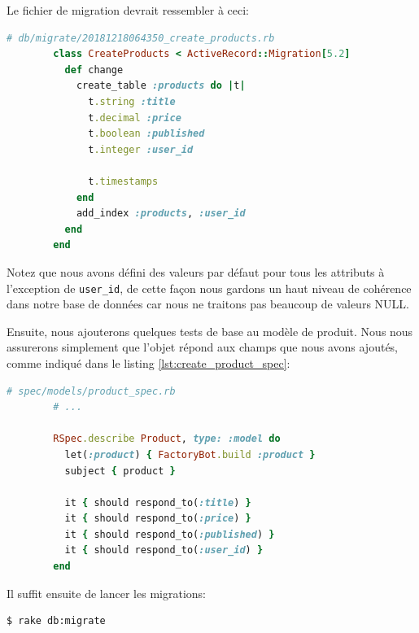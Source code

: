 \documentclass[]{report}
\begin{document}
      Le fichier de migration devrait ressembler à ceci:

      \begin{scriptsize}
        \begin{lstlisting}[language=ruby]
        # db/migrate/20181218064350_create_products.rb
        class CreateProducts < ActiveRecord::Migration[5.2]
          def change
            create_table :products do |t|
              t.string :title
              t.decimal :price
              t.boolean :published
              t.integer :user_id

              t.timestamps
            end
            add_index :products, :user_id
          end
        end
        \end{lstlisting}
      \end{scriptsize}

      Notez que nous avons défini des valeurs par défaut pour tous les attributs à l'exception de \verb|user_id|, de cette façon nous gardons un haut niveau de cohérence dans notre base de données car nous ne traitons pas beaucoup de valeurs NULL.

      Ensuite, nous ajouterons quelques tests de base au modèle de produit. Nous nous assurerons simplement que l'objet répond aux champs que nous avons ajoutés, comme indiqué dans le listing \ref{lst:create_product_spec}:

      \begin{scriptsize}
        \begin{lstlisting}[language=ruby, caption={Le premier test de notre modèle de produit}, label={lst:create_product_spec}]
        # spec/models/product_spec.rb
        # ...

        RSpec.describe Product, type: :model do
          let(:product) { FactoryBot.build :product }
          subject { product }

          it { should respond_to(:title) }
          it { should respond_to(:price) }
          it { should respond_to(:published) }
          it { should respond_to(:user_id) }
        end
        \end{lstlisting}
      \end{scriptsize}

      Il suffit ensuite de lancer les migrations:

      \begin{scriptsize}
        \begin{lstlisting}[language=bash]
        $ rake db:migrate
        \end{lstlisting}
      \end{scriptsize}
\end{document}
